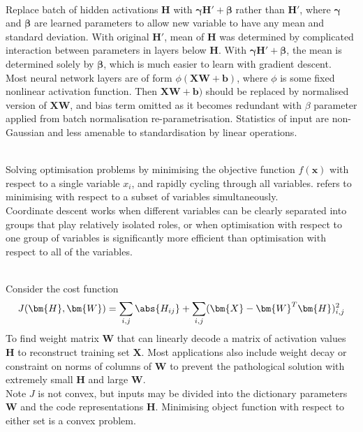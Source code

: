 \begin{remark} \\
Replace batch of hidden activations $\bm{H}$ with $\bm{\gamma} \bm{H}' + \bm{\beta}$ rather than $\bm{H}'$, where $\bm{\gamma}$ and $\bm{\beta}$ are learned parameters to allow new variable to have any mean and standard deviation. With original $\bm{H}'$, mean of $\bm{H}$ was determined by complicated interaction between parameters in layers below $\bm{H}$. With $\bm{\gamma} \bm{H}' + \bm{\beta}$, the mean is determined solely by $\bm{\beta}$, which is much easier to learn with gradient descent.\\
Most neural network layers are of form $\phi(\bm{X} \bm{W} + \bm{b})$, where $\phi$ is some fixed nonlinear activation function. Then $\bm{X} \bm{W} + \bm{b})$ should be replaced by normalised version of $\bm{X} \bm{W}$, and bias term omitted as it becomes redundant with $\beta$ parameter applied from batch normalisation re-parametrisation. Statistics of input are non-Gaussian and less amenable to standardisation by linear operations.	
\end{remark}

\begin{remark} \\
Solving optimisation problems by minimising the objective function $f(\bm{x})$ with respect to a single variable $x_i$, and rapidly cycling through all variables.  refers to minimising with respect to a subset of variables simultaneously.\\
 Coordinate descent works when different variables can be clearly separated into groups that play relatively isolated roles, or when optimisation with respect to one group of variables is significantly more efficient than optimisation with respect to all of the variables.
\end{remark}

\begin{example} \\
Consider the cost function
\begin{align}
J(\bm{H}, \bm{W}) = \sum\limits_{i,j} \abs{H_{ij}} + \sum\limits_{i,j} (\bm{X} - \bm{W}^T \bm{H})^2_{i,j} \nonumber
\end{align}
To find weight matrix $\bm{W}$ that can linearly decode a matrix of activation values $\bm{H}$ to reconstruct training set $\bm{X}$. Most applications also include weight decay or constraint on norms of columns of $\bm{W}$ to prevent the pathological solution with extremely small $\bm{H}$ and large $\bm{W}$.\\
Note $J$ is not convex, but inputs may be divided into the dictionary parameters $\bm{W}$ and the code representations $\bm{H}$. Minimising object function with respect to either set is a convex problem.
\end{example}


